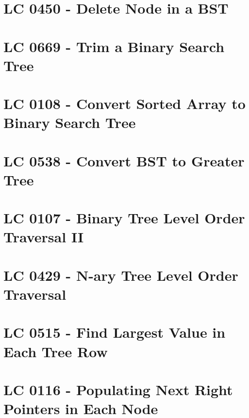 \section{LC 0450 - Delete Node in a BST}

\section{LC 0669 - Trim a Binary Search Tree}

\section{LC 0108 - Convert Sorted Array to Binary Search Tree}

\section{LC 0538 - Convert BST to Greater Tree}

\section{LC 0107 - Binary Tree Level Order Traversal II}

\section{LC 0429 - N-ary Tree Level Order Traversal}

\section{LC 0515 - Find Largest Value in Each Tree Row}

\section{LC 0116 - Populating Next Right Pointers in Each Node}